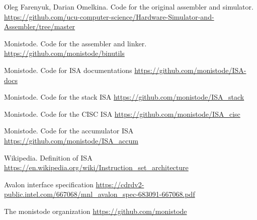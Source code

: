 \documentclass[conference]{IEEEtran}
\begin{document}
\begin{thebibliography}{00}
	Oleg Farenyuk, Darian Omelkina. Code for the original assembler and simulator.
	\url{https://github.com/ucu-computer-science/Hardware-Simulator-and-Assembler/tree/master}

	Monistode. Code for the assembler and linker.
	\url{https://github.com/monistode/binutils}

	Monistode. Code for ISA documentations
	\url{https://github.com/monistode/ISA-docs}

	Monistode. Code for the stack ISA
	\url{https://github.com/monistode/ISA_stack}

	Monistode. Code for the CISC ISA
	\url{https://github.com/monistode/ISA_cisc}

	Monistode. Code for the accumulator ISA
	\url{https://github.com/monistode/ISA_accum}

	Wikipedia. Definition of ISA
	\url{https://en.wikipedia.org/wiki/Instruction_set_architecture}

	Avalon interface specification
	\url{https://cdrdv2-public.intel.com/667068/mnl_avalon_spec-683091-667068.pdf}

	The monistode organization
	\url{https://github.com/monistode}
\end{thebibliography}
\end{document}
